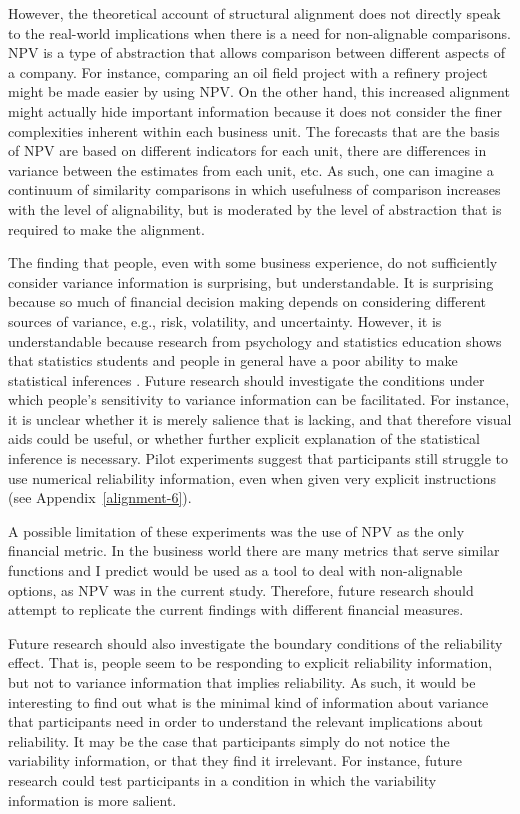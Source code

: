 \documentclass[a4paper, nobind, dvipsnames]{templates/ociamthesis}
\theoremstyle{definition}
\theoremstyle{definition}
\theoremstyle{definition}
\theoremstyle{definition}
\theoremstyle{remark}
\begin{document}
However, the theoretical account of structural alignment does not directly speak
to the real-world implications when there is a need for non-alignable
comparisons. NPV is a type of abstraction that allows comparison between
different aspects of a company. For instance, comparing an oil field project
with a refinery project might be made easier by using NPV. On the other hand,
this increased alignment might actually hide important information because it
does not consider the finer complexities inherent within each business unit. The
forecasts that are the basis of NPV are based on different indicators for each
unit, there are differences in variance between the estimates from each unit,
etc. As such, one can imagine a continuum of similarity comparisons in which
usefulness of comparison increases with the level of alignability, but is
moderated by the level of abstraction that is required to make the alignment.

The finding that people, even with some business experience, do not sufficiently
consider variance information is surprising, but understandable. It is
surprising because so much of financial decision making depends on considering
different sources of variance, e.g., risk, volatility, and uncertainty. However,
it is understandable because research from psychology and statistics education
shows that statistics students and people in general have a poor ability to make
statistical inferences \autocite{galesic2010,konold1993}. Future research should
investigate the conditions under which people's sensitivity to variance
information can be facilitated. For instance, it is unclear whether it is merely
salience that is lacking, and that therefore visual aids could be useful, or
whether further explicit explanation of the statistical inference is necessary.
Pilot experiments suggest that participants still struggle to use numerical
reliability information, even when given very explicit instructions (see
Appendix~\ref{alignment-6}).

A possible limitation of these experiments was the use of NPV as the only
financial metric. In the business world there are many metrics that serve
similar functions and I predict would be used as a tool to deal with
non-alignable options, as NPV was in the current study. Therefore, future
research should attempt to replicate the current findings with different
financial measures.

Future research should also investigate the boundary conditions of the
reliability effect. That is, people seem to be responding to explicit
reliability information, but not to variance information that implies
reliability. As such, it would be interesting to find out what is the minimal
kind of information about variance that participants need in order to understand
the relevant implications about reliability. It may be the case that
participants simply do not notice the variability information, or that they find
it irrelevant. For instance, future research could test participants in a
condition in which the variability information is more salient.
\end{document}
